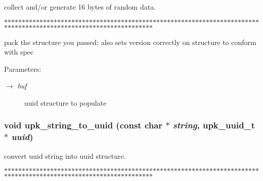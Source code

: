 collect and/or generate 16 bytes of random data. 

$\ast$$\ast$$\ast$$\ast$$\ast$$\ast$$\ast$$\ast$$\ast$$\ast$$\ast$$\ast$$\ast$$\ast$$\ast$$\ast$$\ast$$\ast$$\ast$$\ast$$\ast$$\ast$$\ast$$\ast$$\ast$$\ast$$\ast$$\ast$$\ast$$\ast$$\ast$$\ast$$\ast$$\ast$$\ast$$\ast$$\ast$$\ast$$\ast$$\ast$$\ast$$\ast$$\ast$$\ast$$\ast$$\ast$$\ast$$\ast$$\ast$$\ast$$\ast$$\ast$$\ast$$\ast$$\ast$$\ast$$\ast$$\ast$$\ast$$\ast$$\ast$$\ast$$\ast$$\ast$$\ast$$\ast$$\ast$$\ast$$\ast$$\ast$$\ast$$\ast$$\ast$$\ast$$\ast$$\ast$$\ast$$\ast$$\ast$$\ast$$\ast$$\ast$$\ast$$\ast$$\ast$$\ast$$\ast$$\ast$$\ast$$\ast$$\ast$$\ast$$\ast$$\ast$$\ast$$\ast$$\ast$$\ast$$\ast$$\ast$$\ast$$\ast$$\ast$$\ast$$\ast$$\ast$$\ast$$\ast$$\ast$$\ast$$\ast$$\ast$$\ast$$\ast$

pack the structure you passed; also sets version correctly on structure to conform with spec

\begin{Desc}
\item[Parameters:]
\begin{description}
\item[\mbox{$\rightarrow$} {\em buf}]uuid structure to populate \end{description}
\end{Desc}
\subsubsection{\setlength{\rightskip}{0pt plus 5cm}void upk\_\-string\_\-to\_\-uuid (const char $\ast$ {\em string}, \bf{upk\_\-uuid\_\-t} $\ast$ {\em uuid})}\label{group__uuid__functions_g1dfeb04a01974489a839d73c968c55f9}


convert uuid string into uuid structure. 

$\ast$$\ast$$\ast$$\ast$$\ast$$\ast$$\ast$$\ast$$\ast$$\ast$$\ast$$\ast$$\ast$$\ast$$\ast$$\ast$$\ast$$\ast$$\ast$$\ast$$\ast$$\ast$$\ast$$\ast$$\ast$$\ast$$\ast$$\ast$$\ast$$\ast$$\ast$$\ast$$\ast$$\ast$$\ast$$\ast$$\ast$$\ast$$\ast$$\ast$$\ast$$\ast$$\ast$$\ast$$\ast$$\ast$$\ast$$\ast$$\ast$$\ast$$\ast$$\ast$$\ast$$\ast$$\ast$$\ast$$\ast$$\ast$$\ast$$\ast$$\ast$$\ast$$\ast$$\ast$$\ast$$\ast$$\ast$$\ast$$\ast$$\ast$$\ast$$\ast$$\ast$$\ast$$\ast$$\ast$$\ast$$\ast$$\ast$$\ast$$\ast$$\ast$$\ast$$\ast$$\ast$$\ast$$\ast$$\ast$$\ast$$\ast$$\ast$$\ast$$\ast$$\ast$$\ast$$\ast$$\ast$$\ast$$\ast$$\ast$$\ast$$\ast$$\ast$$\ast$$\ast$$\ast$$\ast$$\ast$$\ast$$\ast$$\ast$$\ast$$\ast$$\ast$

